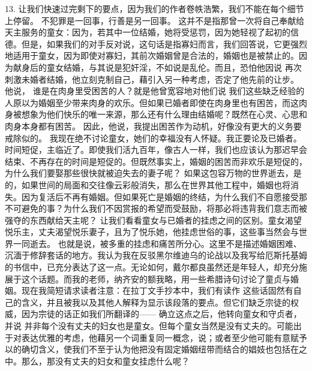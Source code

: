 13. 让我们快速过完剩下的要点，因为我们的作者卷帙浩繁，我们不能在每个细节上停留。 不犯罪是一回事，行善是另一回事。 这并不是指那曾一次将自己奉献给天主服务的童女：因为，若其中一位结婚，她将受惩罚，因为她轻视了起初的信德。但是，如果我们的对手反对说，这句话是指寡妇而言，我们回答说，它更强烈地适用于童女，因为即使对寡妇，其前次婚姻曾是合法的，婚姻也是被禁止的。因为献身后的童女结婚，与其说是犯奸淫，不如说是乱伦。而且，恐怕他因说 再次刺激未婚者结婚，他立刻克制自己，藉引入另一种考虑，否定了他先前的让步。 他说， 谁是在肉身里受困苦的人？就是他曾宽容地对他们说 我们这些缺乏经验的人原以为婚姻至少带来肉身的欢乐。但如果已婚者即使在肉身里也有困苦，而这肉身被想象为他们快乐的唯一来源，那么还有什么理由结婚呢？既然在心灵、心思和肉身本身都有困苦。 因此，他说，我提出困苦作为动机，好像没有更大的义务要戒除似的。 我现在绝不讨论童女，她们的幸福没有人怀疑。我正要论及已婚者。时间短促，主临近了。即使我们活九百年，像古人一样，我们也应该认为那迟早会结束、不再存在的时间是短促的。但既然事实上，婚姻的困苦而非欢乐是短促的，为什么我们要娶那些很快就被迫失去的妻子呢？ 如果这包容万物的世界逝去，是的，如果世间的局面和交往像云彩般消失，那么在世界其他工程中，婚姻也将消失。因为复活后不再有婚姻。但如果死亡是婚姻的终结，为什么我们不自愿接受那不可避免的事？为什么我们不因赏报的希望而受鼓励，将那必将违背我们意志而被强夺的东西献给天主呢？ 让我们看看童女与已婚者的挂虑之间的区别。童女渴望悦乐主，丈夫渴望悦乐妻子，且为了悦乐她，他挂虑世俗的事，这些事当然会与世界一同逝去。 也就是说，被多重的挂虑和痛苦所分心。这里不是描述婚姻困难、沉湎于修辞套话的地方。我认为我在反驳黑尔维迪乌的论战以及我写给厄斯托基姆的书信中，已充分表达了这一点。无论如何，戴尔都良虽然还是年轻人，却充分施展于这个话题。而我的老师，纳齐安的额我略，用一些希腊诗句讨论了童贞与婚姻。现在我简短请求读者注意：在拉丁文手抄本中，我们有读作 这些话固然有自己的含义，并且被我以及其他人解释为显示该段落的要点。但它们缺乏宗徒的权威，因为宗徒的话正如我们所翻译的—— 确立这点之后，他转向童女和守贞者，并说 并非每个没有丈夫的妇女也是童女。但每个童女当然是没有丈夫的。可能出于对表达优雅的考虑，他藉另一个词重复同一概念，说；或者至少他可能有意赋予以的确切含义，使我们不至于认为他把没有固定婚姻纽带而结合的娼妓也包括在之中。那么，那没有丈夫的妇女和童女挂虑什么呢？ 